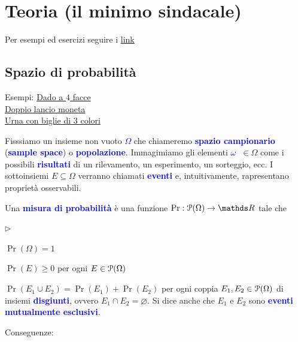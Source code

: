 \documentclass[12pt,openany]{book}
\def\RR{\mathds R}
\def\P{\EuScript P}
\def\0{\varnothing}
\newcommand{\mylabel}[1]{{\footnotesize\textsf{#1}}\hfill}
\renewenvironment{itemize}
  {\begin{list}{$\triangleright$}{%
   \setlength{\parskip}{0mm}
   \setlength{\topsep}{.2\baselineskip}
   \setlength{\rightmargin}{0mm}
   \setlength{\listparindent}{0mm}
   \setlength{\itemindent}{0mm}
   \setlength{\labelwidth}{3ex}
   \setlength{\itemsep}{.4\baselineskip}
   \setlength{\parsep}{0mm}
   \setlength{\partopsep}{0mm}
   \setlength{\labelsep}{1ex}
   \setlength{\leftmargin}{\labelwidth+\labelsep}
   \let\makelabel\mylabel}}{%
   \end{list}\vspace*{-1.3mm}}
\def\emph#1{\textcolor{blue}{\textbf{\boldmath #1}}}
\theoremstyle{mio}
\theoremstyle{liscio}
\begin{document}
\setlength{\abovedisplayskip}{-1ex}
\setlength{\belowdisplayskip}{0pt}



\chapter{Teoria (il minimo sindacale)}
\raggedbottom

Per esempi ed esercizi seguire i \hyperref[ch2]{link \faShare}

\hfill{}\clearpage\section{Spazio di probabilità}

{\color{brown}Esempi: \hyperref[tetraedro]{Dado a $4$ facce \faShare}
\\
\hphantom{Esempi:} \hyperref[doppo_lancio_moneta]{Doppio lancio moneta \faShare}
\\
\hphantom{Esempi:} \hyperref[urna_3_colori]{Urna con biglie di 3 colori \faShare}}





\def\medrel#1{\parbox[t]{5ex}{$\displaystyle\hfil #1$}}
\def\ceq#1#2#3{\parbox{24ex}{$\displaystyle #1$}\medrel{#2}$\displaystyle  #3$}


Fisssiamo un insieme non vuoto \emph{$\Omega$\/} che chiameremo \emph{spazio campionario\/}  (\emph{sample space\/}) o \emph{popolazione}. Immagimiamo gli elementi \emph{$\omega$\ }$\in\Omega$ come i possibili \emph{risultati\/} di un rilevamento, un esperimento, un sorteggio, ecc. I sottoinsiemi $E\subseteq\Omega$ verranno chiamati \emph{eventi\/} e, intuitivamente, rapresentano proprietà osservabili.

Una \emph{misura di probabilità\/} è una funzione $\Pr:\P(\Omega)\to\RR$ tale che 

\begin{itemize}
\item $\Pr(\Omega)=1$
\item $\Pr(E)\ge0$ per ogni $E\in\P(\Omega)$
\item $\Pr(E_1\cup E_2)=\Pr(E_1)+\Pr(E_2)$ per ogni coppia $E_1,E_2\in\P(\Omega)$ di insiemi \emph{disgiunti}, ovvero $E_1\cap E_2=\0$. Si dice anche che $E_1$ e $E_2$ sono \emph{eventi mutualmente esclusivi}.
\end{itemize}

Conseguenze:
\end{document}
